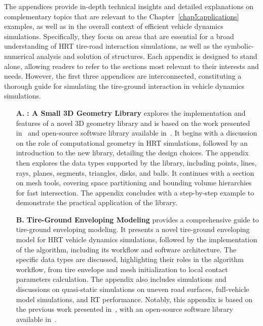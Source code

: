 The appendices provide in-depth technical insights and detailed explanations on complementary topics that are relevant to the Chapter~\ref{chap5:applications} examples, as well as in the overall context of efficient vehicle dynamics simulations. Specifically, they focus on areas that are essential for a broad understanding of \ac{HRT} tire-road interaction simulations, as well as the symbolic-numerical analysis and solution of structures. Each appendix is designed to stand alone, allowing readers to refer to the sections most relevant to their interests and needs. However, the first three appendices are interconnected, constituting a thorough guide for simulating the tire-ground interaction in vehicle dynamics simulations.
%
\begin{enumerate}
  \setlength{\itemsep}{0.0em}
  \item[\textbf{A.}] \textbf{\Acme{}: A Small 3D Geometry Library} explores the implementation and features of a novel 3D geometry library and is based on the work presented in~\cite{stocco2021acme} and open-source software library available in~\cite{acme}. It begins with a discussion on the role of computational geometry in \ac{HRT} simulations, followed by an introduction to the new library, detailing the design choices. The appendix then explores the data types supported by the library, including points, lines, rays, planes, segments, triangles, disks, and balls. It continues with a section on mesh tools, covering space partitioning and bounding volume hierarchies for fast intersection. The appendix concludes with a step-by-step example to demonstrate the practical application of the library.
  \item[\textbf{B.}] \textbf{Tire-Ground Enveloping Modeling} provides a comprehensive guide to tire-ground enveloping modeling. It presents a novel tire-ground enveloping model for \ac{HRT} vehicle dynamics simulations, followed by the implementation of the algorithm, including its workflow and software architecture. The specific data types are discussed, highlighting their roles in the algorithm workflow, from tire envelope and mesh initialization to local contact parameters calculation. The appendix also includes simulations and discussions on quasi-static simulations on uneven road surfaces, full-vehicle model simulations, and \ac{RT} performance. Notably, this appendix is based on the previous work presented in~\cite{stocco2024novel}, with an open-source software library available in~\cite{enve}.

\end{enumerate}
